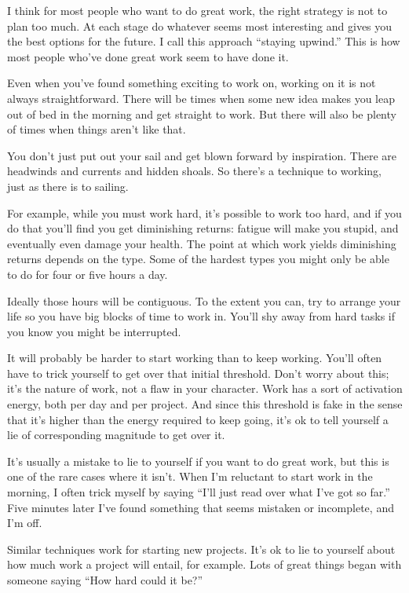 \documentclass[12pt]{book}
\begin{document}
I think for most people who want to do great work, the right strategy is
not to plan too much. At each stage do whatever seems most interesting
and gives you the best options for the future. I call this approach
``staying upwind.'' This is how most people who've done great work seem
to have done it.

Even when you've found something exciting to work on, working on it is
not always straightforward. There will be times when some new idea makes
you leap out of bed in the morning and get straight to work. But there
will also be plenty of times when things aren't like that.

You don't just put out your sail and get blown forward by inspiration.
There are headwinds and currents and hidden shoals. So there's a
technique to working, just as there is to sailing.

For example, while you must work hard, it's possible to work too hard,
and if you do that you'll find you get diminishing returns: fatigue will
make you stupid, and eventually even damage your health. The point at
which work yields diminishing returns depends on the type. Some of the
hardest types you might only be able to do for four or five hours a day.

Ideally those hours will be contiguous. To the extent you can, try to
arrange your life so you have big blocks of time to work in. You'll shy
away from hard tasks if you know you might be interrupted.

It will probably be harder to start working than to keep working. You'll
often have to trick yourself to get over that initial threshold. Don't
worry about this; it's the nature of work, not a flaw in your character.
Work has a sort of activation energy, both per day and per project. And
since this threshold is fake in the sense that it's higher than the
energy required to keep going, it's ok to tell yourself a lie of
corresponding magnitude to get over it.

It's usually a mistake to lie to yourself if you want to do great work,
but this is one of the rare cases where it isn't. When I'm reluctant to
start work in the morning, I often trick myself by saying ``I'll just
read over what I've got so far.'' Five minutes later I've found
something that seems mistaken or incomplete, and I'm off.

Similar techniques work for starting new projects. It's ok to lie to
yourself about how much work a project will entail, for example. Lots of
great things began with someone saying ``How hard could it be?''
\end{document}
